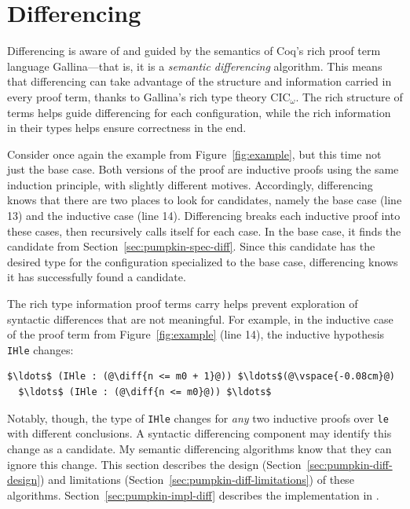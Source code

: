 \section{Differencing}
\label{sec:pumpkin-diff}



Differencing is aware of and guided by the semantics of Coq's rich proof term language Gallina---that is, it is a \textit{semantic differencing} algorithm.
This means that differencing can take advantage of the structure and information carried in every proof term,
thanks to Gallina's rich type theory CIC$_{\omega}$.
The rich structure of terms helps guide differencing for each configuration,
while the rich information in their types helps ensure correctness in the end.

Consider once again the example from Figure~\ref{fig:example}, but this time not just the base case.
Both versions of the proof are inductive proofs using the same induction principle, with slightly different motives.
Accordingly, differencing knows that there are two places to look for candidates, namely the base case (line 13)
and the inductive case (line 14).
Differencing breaks each inductive proof into these cases, then recursively calls itself for each case.
In the base case, it finds the candidate from Section~\ref{sec:pumpkin-spec-diff}.
Since this candidate has the desired type for the configuration specialized to the base case, differencing knows it has successfully found a candidate.

The rich type information proof terms carry helps prevent exploration of syntactic differences that are not meaningful.
For example, in the inductive case of the proof term from Figure~\ref{fig:example} (line 14), the inductive hypothesis \lstinline{IHle} changes:

\begin{lstlisting}[language=coq]
  $\ldots$ (IHle : (@\diff{n <= m0 + 1}@)) $\ldots$(@\vspace{-0.08cm}@)
  $\ldots$ (IHle : (@\diff{n <= m0}@)) $\ldots$
\end{lstlisting}
Notably, though, the type of \lstinline{IHle} changes for \emph{any} two inductive proofs over \lstinline{le}
with different conclusions. A syntactic differencing component 
may identify this change as a candidate.
My semantic differencing algorithms know that they can ignore this change.
This section describes the design (Section~\ref{sec:pumpkin-diff-design}) and limitations (Section~\ref{sec:pumpkin-diff-limitations}) of these algorithms.
Section~\ref{sec:pumpkin-impl-diff} describes the implementation in \sysname.

